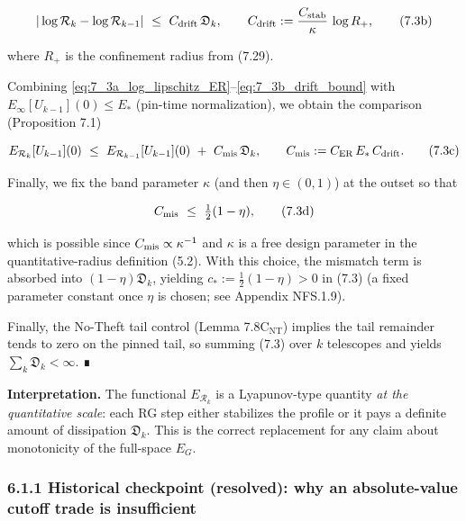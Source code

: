 \documentclass[
  11pt,
]{article}
\begin{document}
\begin{equation}
 |\log\mathcal R_k-\log\mathcal R_{k-1}|
 \ \le\
 C_{\rm drift}\,\mathfrak D_k,
 \qquad
 C_{\rm drift}:=\frac{C_{\rm stab}}{\kappa}\,\log R_+,
 \tag{7.3b}\label{eq:7_3b_drift_bound}
\end{equation}

where \(R_+\) is the confinement radius from (7.29).

Combining \eqref{eq:7_3a_log_lipschitz_ER}--\eqref{eq:7_3b_drift_bound} with \(E_\infty[U_{k-1}](0)\le E_\ast\) (pin-time normalization), we obtain the comparison (Proposition 7.1)

\begin{equation}
E_{\mathcal R_k}[U_{k-1}](0)\ \le\ E_{\mathcal R_{k-1}}[U_{k-1}](0)\ +\ C_{\rm mis}\,\mathfrak D_k,
\qquad
C_{\rm mis}:=C_{\rm ER}\,E_\ast\,C_{\rm drift}.
\tag{7.3c}\label{eq:7_3c_energy_mismatch}
\end{equation}

Finally, we fix the band parameter \(\kappa\) (and then \(\eta\in(0,1)\)) at the outset so that

\begin{equation}
C_{\rm mis}\ \le\ \tfrac12(1-\eta),
\tag{7.3d}\label{eq:7_3d_parameter_choice_absorb}
\end{equation}

which is possible since \(C_{\rm mis}\propto \kappa^{-1}\) and \(\kappa\) is a free design parameter in the quantitative-radius definition (5.2). With this choice, the mismatch term is absorbed into \((1-\eta)\mathfrak D_k\), yielding \(c_*:=\tfrac12(1-\eta)>0\) in (7.3) (a fixed parameter constant once \(\eta\) is chosen; see Appendix NFS.1.9).

Finally, the No-Theft tail control (Lemma 7.8C\(_\mathrm{NT}\)) implies the tail remainder tends to zero on the pinned tail, so summing (7.3) over \(k\) telescopes and yields \(\sum_k \mathfrak D_k<\infty\). ∎

\textbf{Interpretation.} The functional \(E_{\mathcal R_k}\) is a Lyapunov-type quantity \emph{at the quantitative scale}: each RG step either stabilizes the profile or it pays a definite amount of dissipation \(\mathfrak D_k\). This is the correct replacement for any claim about monotonicity of the full-space \(E_G\).

\hypertarget{historical-checkpoint-resolved-why-an-absolute-value-cutoff-trade-is-insufficient}{%
\subsubsection{6.1.1 Historical checkpoint (resolved): why an absolute-value cutoff trade is insufficient}\label{historical-checkpoint-resolved-why-an-absolute-value-cutoff-trade-is-insufficient}}
\end{document}
